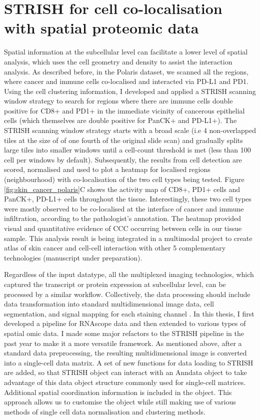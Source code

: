 \section{STRISH for cell co-localisation with spatial proteomic data}
\label{Sec:3.3_STRISH2.0}	%
Spatial information at the subcellular level can facilitate a lower level of spatial analysis, which uses the cell geometry and density to assist the interaction analysis. As described before, in the Polaris dataset, we scanned all the regions, where cancer and immune cells co-localised and interacted via PD-L1 and PD1. Using the cell clustering information, I developed and applied a STRISH scanning window strategy to search for regions where there are immune cells double positive for CD8+ and PD1+ in the immediate vicinity of cancerous epithelial cells (which themselves are double positive for PanCK+ and PD-L1+). The STRISH scanning window strategy starts with a broad scale (i.e 4 non-overlapped tiles at the size of of one fourth of the original slide scan) and gradually splits large tiles into smaller windows until a cell-count threshold is met (less than 100 cell per windows by default). Subsequently, the results from cell detection are scored, normalised and used to plot a heatmap for localised regions (neighbourhood) with co-localisation of the two cell types being tested. Figure \ref{fig:skin_cancer_polaris}C shows the activity map of CD8+, PD1+ cells and PanCK+, PD-L1+ cells throughout the tissue. Interestingly, these two cell types were mostly observed to be co-localised at the interface of cancer and immune infiltration, according to the pathologist's annotation. The heatmap provided visual and quantitative evidence of CCC occurring between cells in our tissue sample. This analysis result is being integrated in a multimodal project to create atlas of skin cancer and cell-cell interaction with other 5 complementary technologies (manuscript under preparation).

Regardless of the input datatype, all the multiplexed imaging technologies, which captured the transcript or protein expression at subcellular level, can be processed by a similar workflow. Collectively, the data processing should include data transformation into standard multidimensional image data, cell segmentation, and signal mapping for each staining channel \cite{shakya2020immune, liu2019comparison, aghaeepour2013critical}. In this thesis, I first developed a pipeline for RNAscope data and then extended to various types of spatial omic data. I made some major refactors to the STRISH pipeline in the past year to make it a more versatile framework. 
As mentioned above, after a standard data preprocessing, the resulting multidimensional image is converted into a single-cell data matrix. A set of new functions for data loading to STRISH are added, so that STRISH object can interact with an Anndata object \cite{wolf2018scanpy} to take advantage of this data object structure commonly used for single-cell matrices. Additional spatial coordination information is included in the object. This approach allows us to customise the object while still making use of various methods of single cell data normalisation and clustering methods. 

